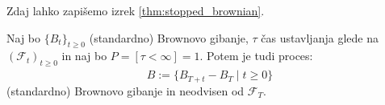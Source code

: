 \documentclass[11pt]{article}
\newcommand{\f}{\mathcal{F}}
\begin{document}
    Zdaj lahko zapišemo izrek \ref{thm:stopped_brownian}. %
    
    \begin{izrek}
    Naj bo $\{B_t\}_{t \geq 0}$ (standardno) Brownovo gibanje, $ \tau$ čas ustavljanja glede na 
    $ (\f_t)_{t \geq 0}$ in naj bo $ P=[\tau < \infty] = 1$.
    Potem je tudi proces:
    \[
    \hat{B} := \{B_{T+t} - B_T \mid t \geq 0\}
    \]
    (standardno) Brownovo gibanje in neodvisen od $ \f_T$.
    \label{thm:stopped_brownian}
    \end{izrek}
    
    

    
    
\end{document}
